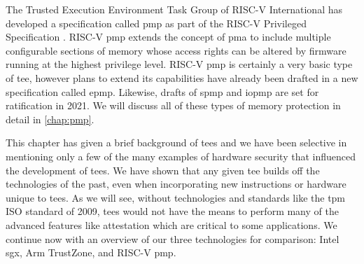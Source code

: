 The Trusted Execution Environment Task Group of RISC-V International has developed a specification called \gls{pmp} as part of the RISC-V Privileged Specification \cite{PrivIsa2019}. RISC-V \gls{pmp} extends the concept of \gls{pma} to include multiple configurable sections of memory whose access rights can be altered by firmware running at the highest privilege level. RISC-V \gls{pmp} is certainly a very basic type of \gls{tee}, however plans to extend its capabilities have already been drafted in a new specification called \gls{epmp}. Likewise, drafts of \gls{spmp} and \gls{iopmp} are set for ratification in 2021. We will discuss all of these types of memory protection in detail in \autoref{chap:pmp}.

This chapter has given a brief background of \glspl{tee} and we have been selective in mentioning only a few of the many examples of hardware security that influenced the development of \glspl{tee}. We have shown that any given \gls{tee} builds off the technologies of the past, even when incorporating new instructions or hardware unique to \glspl{tee}. As we will see, without technologies and standards like the \gls{tpm} ISO standard of 2009, \glspl{tee} would not have the means to perform many of the advanced features like attestation which are critical to some applications. We continue now with an overview of our three technologies for comparison: Intel \gls{sgx}, Arm TrustZone, and RISC-V \gls{pmp}.



